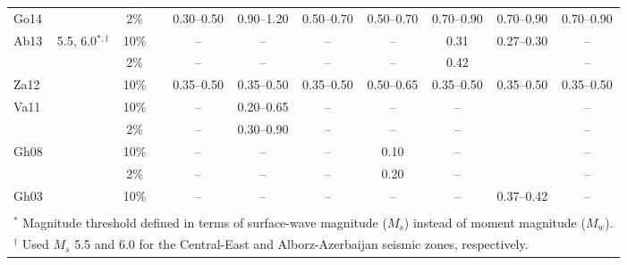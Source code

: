 \begin{table*}[t]
\begin{tabular}{lcccccccccc}
    Go14    &       &   2\%  && 0.30--0.50  & 0.90--1.20  & 0.50--0.70  & 0.50--0.70  & 0.70--0.90  & 0.70--0.90  & 0.70--0.90  \\
    Ab13    & 5.5, 6.0${}^{*,\dagger}$ 
                    &  10\%  &&   --        &   --        &   --        &   --        &   0.31      & 0.27--0.30  &   --        \\
            &       &   2\%  &&   --        &   --        &   --        &   --        &   0.42      &             &   --        \\
    Za12    &       &  10\%  && 0.35--0.50  & 0.35--0.50  & 0.35--0.50  & 0.50--0.65  & 0.35--0.50  & 0.35--0.50  & 0.35--0.50  \\
    Va11    &       &  10\%  &&   --        & 0.20--0.65  &   --        &   --        &   --        &             &   --        \\
            &       &   2\%  &&   --        & 0.30--0.90  &   --        &   --        &   --        &             &   --        \\
    Gh08    &       &  10\%  &&   --        &   --        &   --        &   0.10      &   --        &             &   --        \\
            &       &   2\%  &&   --        &   --        &   --        &   0.20      &   --        &             &   --        \\
    Gh03    &       &  10\%  &&   --        &   --        &   --        &   --        &   --        & 0.37--0.42  &   --        \\[0.6ex]
    \hline                                                                                                                      \\[-1.6ex]
    \multicolumn{11}{l}{\small{${}^{*}$ Magnitude threshold defined in terms of surface-wave magnitude ($M_s$) instead of moment magnitude ($M_w$).}}\\
    \multicolumn{11}{l}{\small{${}^{\dagger}$ Used $M_s$ 5.5 and 6.0 for the Central-East and Alborz-Azerbaijan seismic zones, respectively.}}    
\end{tabular}
\label{tab:pga} 
\end{table*}

